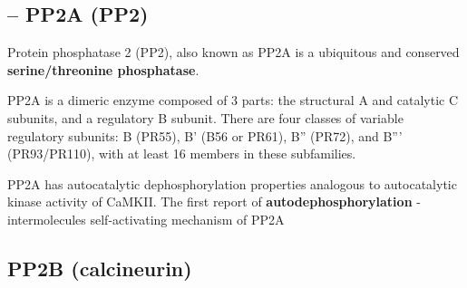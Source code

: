 \subsection{-- PP2A (PP2)}
\label{sec:PP2A}

Protein phosphatase 2 (PP2), also known as PP2A is a ubiquitous and conserved
{\bf serine/threonine phosphatase}.

PP2A is a dimeric enzyme composed of 3 parts:
the structural A and catalytic C subunits, and a regulatory B subunit.
There are  four classes of variable regulatory subunits: B (PR55), B' (B56 or
PR61), B'' (PR72), and B''' (PR93/PR110), with at least 16 members in these
subfamilies.


PP2A has autocatalytic dephosphorylation properties analogous to autocatalytic
kinase activity of CaMKII.
The first report of {\bf autodephosphorylation} - intermolecules self-activating
mechanism of PP2A


\subsection{PP2B (calcineurin)}
\label{sec:calcineurin}
\label{sec:PP2B}
\label{chap:calcineurin}

